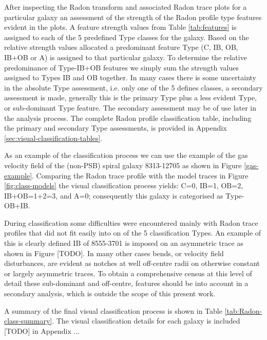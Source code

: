 After inspecting the Radon transform and associated Radon trace plots for a particular galaxy an assessment of the strength of the Radon profile type features evident in the plots. A feature strength values from Table \ref{tab:features} is assigned to each of the 5 predefined Type classes for the galaxy. Based on the relative strength values allocated a predominant feature Type (C, IB, OB, IB+OB or A) is assigned to that particular galaxy. To determine the relative predominance of Type-IB+OB features we simply sum the strength values assigned to Types IB and OB together. 
In many cases there is some uncertainty in the absolute Type assessment, i.e. only one of the 5 defines classes, a secondary assessment is made,  generally this is the primary Type plus a less evident Type, or sub-dominant Type feature. The secondary assessment may be of use later in the analysis process. The complete Radon profile classification table, including the primary and secondary Type assessments, is provided in Appendix \ref{sec:visual-classification-tables}.

As an example of the classification process we can use the example of the gas velocity field of the (non-PSB) spiral galaxy 8313-12705 as shown in Figure \ref{gas-example}. Comparing the Radon trace profile with the model traces in Figure \ref{fig:class-models} the visual classification process yields: C=0, IB=1, OB=2, IB+OB=1+2=3, and A=0; consequently this galaxy is categorised as Type-OB+IB. 

During classification some difficulties were encountered mainly with Radon trace profiles that did not fit easily into on of the 5 classification Types. An example of this is clearly defined IB of 8555-3701 is imposed on an asymmetric trace as shown in Figure [TODO]. In many other cases bends, or velocity field disturbances, are evident as notches at well off-centre radii on otherwise constant or largely asymmetric traces. To obtain a comprehensive census at this level of detail these sub-dominant and off-centre, features should be into account in a secondary analysis, which is outside the scope of this present work.

A summary of the final visual classification process is shown in Table \ref{tab:Radon-class-summary}. The visual classification details for each galaxy is included [TODO] in Appendix ... 


